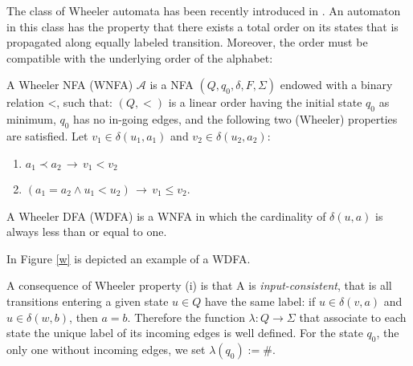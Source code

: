 \documentclass[runningheads]{llncs}
\newcommand{\gr}[1]{{\color{cgreen} #1}}
\begin{document}
The class of Wheeler automata has been recently introduced in \cite{Gagie}. An automaton in this class has the property that there exists a total order on its states that is propagated along equally labeled transition. Moreover, the order must be compatible with the underlying order of the alphabet:

\begin{definition}
\label{WheelerAutomaton}
A Wheeler NFA (WNFA) $\mathcal{A}$ is a NFA $(Q,q_0,\delta,F,\Sigma)$  endowed with a binary relation
<, such that: $(Q,<)$ is a linear order having the initial state $q_0$ as minimum, $q_0$ has no in-going edges, and
the following two (Wheeler) properties are satisfied. Let $v_1 \in \delta(u_1, a_1)$ and $v_2 \in \delta(u_2, a_2)$:
\begin{enumerate}[label = (\roman*)]
    \item $a_1 \prec a_2 \,\rightarrow \, v_1 < v_2$ 
    \item $(a_1 = a_2 \wedge u_1 < u_2) \,\rightarrow \, v_1 \le v_2$.
\end{enumerate}
A Wheeler DFA (WDFA) is a WNFA in which the cardinality of $\delta(u,a)$ is always less than or equal to
one.
\end{definition}

In Figure \ref{w} is depicted an example of a WDFA.

\begin{remark}
A consequence of Wheeler property (i) is that A is \emph{input-consistent}, that is all transitions
entering a given state $u \in Q$ have the same label: if $u \in \delta(v,a)$ and $u \in \delta(w,b)$, then $a=b$. Therefore the function $\lambda: Q\rightarrow \Sigma$ that associate to each state the unique label of its incoming edges is well defined. For the state $q_0$, the only one without incoming edges, we set $\lambda(q_0) := \#$. 
\end{remark}
\end{document}

